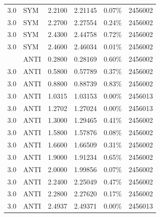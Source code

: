 \begin{center}
\begin{longtable}{@{}rllrrr@{}}
3.0 & SYM & 2.2100 & 2.21145 & 0.07\% & 2456002 \\
3.0 & SYM & 2.2700 & 2.27554 & 0.24\% & 2456002 \\
3.0 & SYM & 2.4300 & 2.44758 & 0.72\% & 2456002 \\
3.0 & SYM & 2.4600 & 2.46034 & 0.01\% & 2456002 \\
\addlinespace
3.0 & ANTI & 0.2800 & 0.28169 & 0.60\% & 2456002 \\
3.0 & ANTI & 0.5800 & 0.57789 & 0.37\% & 2456002 \\
3.0 & ANTI & 0.8800 & 0.88739 & 0.83\% & 2456002 \\
3.0 & ANTI & 1.0315 & 1.03153 & 0.00\% & 2456013 \\
3.0 & ANTI & 1.2702 & 1.27024 & 0.00\% & 2456013 \\
3.0 & ANTI & 1.3000 & 1.29465 & 0.41\% & 2456002 \\
3.0 & ANTI & 1.5800 & 1.57876 & 0.08\% & 2456002 \\
3.0 & ANTI & 1.6600 & 1.66509 & 0.31\% & 2456002 \\
3.0 & ANTI & 1.9000 & 1.91234 & 0.65\% & 2456002 \\
3.0 & ANTI & 2.0000 & 1.99856 & 0.07\% & 2456002 \\
3.0 & ANTI & 2.2400 & 2.25049 & 0.47\% & 2456002 \\
3.0 & ANTI & 2.2800 & 2.27620 & 0.17\% & 2456002 \\
3.0 & ANTI & 2.4937 & 2.49371 & 0.00\% & 2456013 \\
\end{longtable}
\end{center}
